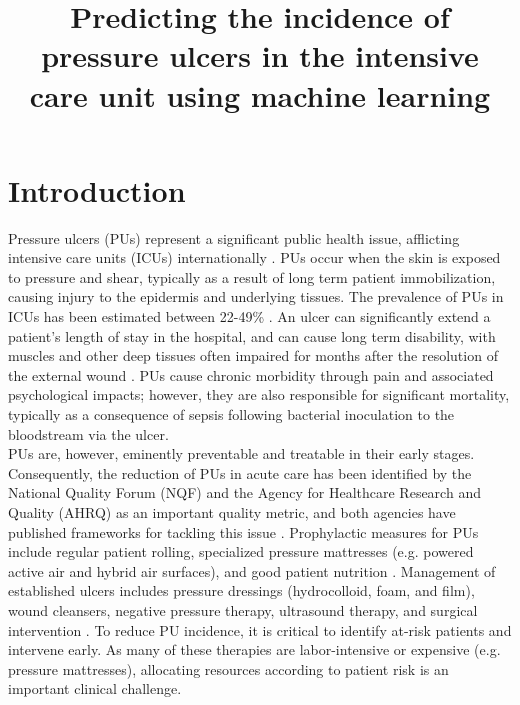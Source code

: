 \documentclass{ws-procs11x85}
\begin{document}
\title{ \Large Predicting the incidence of pressure ulcers in the intensive care unit using machine learning}
\vspace{-7mm}
\section{Introduction}

Pressure ulcers (PUs) represent a significant public health issue, afflicting intensive care units (ICUs) internationally \cite{reddy}. PUs occur when the skin is exposed to pressure and shear, typically as a result of long term patient immobilization, causing injury to the epidermis and underlying tissues. The prevalence of PUs in ICUs has been estimated between 22-49\% \cite{tayyib2,shahin}. An ulcer can significantly extend a patient’s length of stay in the hospital, and can cause long term disability, with muscles and other deep tissues often impaired for months after the resolution of the external wound \cite{morehead}. PUs cause chronic morbidity through pain and associated psychological impacts; however, they are also responsible for significant mortality, typically as a consequence of sepsis following bacterial inoculation to the bloodstream via the ulcer.\\

\noindent
PUs are, however, eminently preventable and treatable in their early stages. Consequently, the reduction of PUs in acute care has been identified by the National Quality Forum (NQF) and the Agency for Healthcare Research and Quality (AHRQ) as an important quality metric, and both agencies have published frameworks for tackling this issue \cite{nqf,ahrq}. Prophylactic measures for PUs include regular patient rolling, specialized pressure mattresses (e.g. powered active air and hybrid air surfaces), and good patient nutrition \cite{rollingrct,surface}. Management of established ulcers includes pressure dressings (hydrocolloid, foam, and film), wound cleansers, negative pressure therapy, ultrasound therapy, and surgical intervention \cite{mgmt}. To reduce PU incidence, it is critical to identify at-risk patients and intervene early. As many of these therapies are labor-intensive or expensive (e.g. pressure mattresses), allocating resources according to patient risk is an important clinical challenge.\\
\end{document}
